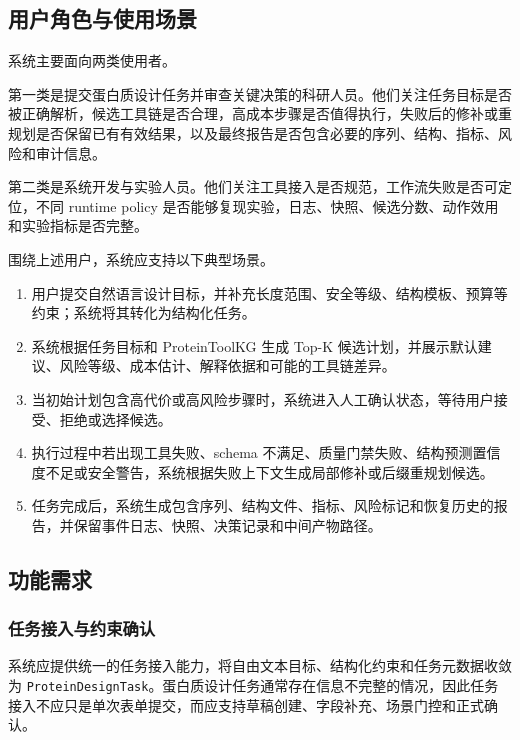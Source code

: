 \subsection{用户角色与使用场景}\label{ux7528ux6237ux89d2ux8272ux4e0eux4f7fux7528ux573aux666f}

系统主要面向两类使用者。

第一类是提交蛋白质设计任务并审查关键决策的科研人员。他们关注任务目标是否被正确解析，候选工具链是否合理，高成本步骤是否值得执行，失败后的修补或重规划是否保留已有有效结果，以及最终报告是否包含必要的序列、结构、指标、风险和审计信息。

第二类是系统开发与实验人员。他们关注工具接入是否规范，工作流失败是否可定位，不同
runtime policy
是否能够复现实验，日志、快照、候选分数、动作效用和实验指标是否完整。

围绕上述用户，系统应支持以下典型场景。

\begin{enumerate}
\def\labelenumi{\arabic{enumi}.}
\tightlist
\item
  用户提交自然语言设计目标，并补充长度范围、安全等级、结构模板、预算等约束；系统将其转化为结构化任务。
\item
  系统根据任务目标和 ProteinToolKG 生成 Top-K
  候选计划，并展示默认建议、风险等级、成本估计、解释依据和可能的工具链差异。
\item
  当初始计划包含高代价或高风险步骤时，系统进入人工确认状态，等待用户接受、拒绝或选择候选。
\item
  执行过程中若出现工具失败、schema
  不满足、质量门禁失败、结构预测置信度不足或安全警告，系统根据失败上下文生成局部修补或后缀重规划候选。
\item
  任务完成后，系统生成包含序列、结构文件、指标、风险标记和恢复历史的报告，并保留事件日志、快照、决策记录和中间产物路径。
\end{enumerate}

\subsection{功能需求}\label{ux529fux80fdux9700ux6c42}

\subsubsection{任务接入与约束确认}\label{ux4efbux52a1ux63a5ux5165ux4e0eux7ea6ux675fux786eux8ba4}

系统应提供统一的任务接入能力，将自由文本目标、结构化约束和任务元数据收敛为
\texttt{ProteinDesignTask}。蛋白质设计任务通常存在信息不完整的情况，因此任务接入不应只是单次表单提交，而应支持草稿创建、字段补充、场景门控和正式确认。

